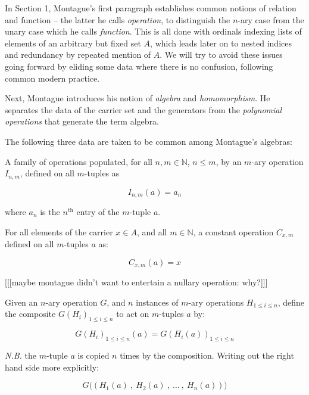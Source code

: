 In Section 1, Montague's first paragraph establishes common notions of relation and function -- the latter he calls \emph{operation}, to distinguish the $n$-ary case from the unary case which he calls \emph{function}. This is all done with ordinals indexing lists of elements of an arbitrary but fixed set $A$, which leads later on to nested indices and redundancy by repeated mention of $A$. We will try to avoid these issues going forward by eliding some data where there is no confusion, following common modern practice.

Next, Montague introduces his notion of \emph{algebra} and \emph{homomorphism}. He separates the data of the carrier set and the generators from the \emph{polynomial operations} that generate the term algebra.

\begin{defn}[Generating data of an Algebra]}\label{algdata} 

Let $A$ be the carrier set, and $F_\gamma$ be a set of functions $A^k \rightarrow A$ for some $k \in \mathbb{N}$, indexed by $\gamma \in \Gamma$. Denoted $\langle A, F_\gamma \rangle_{\gamma \in \Gamma}$

\end{defn}

The following three data are taken to be common among Montague's algebras:

\begin{defn}[Identities]\label{ids} 
A family of operations populated, for all $n, m \in \mathbb{N}$, $n \leq m$, by an $m$-ary operation $I_{n,m}$, defined on all $m$-tuples as

$$I_{n,m}(a) = a_n$$

where $a_n$ is the $n^{\text{th}}$ entry of the $m$-tuple $a$.
\end{defn}


\begin{defn}[Constants]\label{constants}
For all elements of the carrier $x \in A$, and all $m \in \mathbb{N}$, a constant operation $C_{x,m}$ defined on all $m$-tuples $a$ as:

$$C_{x,m}(a) = x$$

\end{defn}

[[[maybe montague didn't want to entertain a nullary operation: why?]]]

\begin{defn}[Composition]\label{comp}
Given an $n$-ary operation $G$, and $n$ instances of $m$-ary operations $H_{1 \leq i \leq n}$, define the composite $G(H_i)_{1 \leq i \leq n}$ to act on $m$-tuples $a$ by:

$$G(H_i)_{1 \leq i \leq n}(a) = G(H_i(a))_{1 \leq i \leq n}$$

\emph{N.B.} the $m$-tuple $a$ is copied $n$ times by the composition. Writing out the right hand side more explicitly:

$$G\bigg( \ \big( \ H_1(a) \ , \ H_2(a) \ , \ \ldots \ , \ H_n(a) \ \big) \  \bigg)$$
\end{defn}

